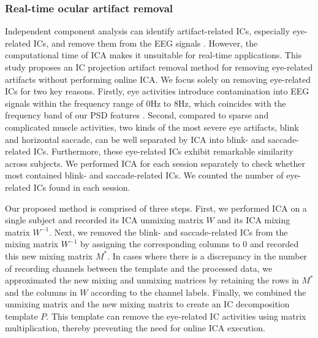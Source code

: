 \documentclass[journal]{IEEEtran}
\newcommand{\mc}[1]{\textcolor{red}{#1}}
\begin{document}
\subsubsection{Real-time ocular artifact removal}
Independent component analysis can identify artifact-related ICs, especially eye-related ICs, and remove them from the EEG signals \cite{Jung2000_bbs, bigdely2013eyecatch, Frolich2004}.
However, the computational time of ICA makes it unsuitable for real-time applications.
This study proposes an IC projection artifact removal method for removing eye-related artifacts without performing online ICA.
We focus solely on removing eye-related ICs for two key reasons. Firstly, eye activities introduce contamination into EEG signals within the frequency range of 0Hz to 8Hz, which coincides with the frequency band of our PSD features \cite{schlogl2007eog_freq_range}.
Second, compared to  sparse and complicated muscle activities, two kinds of the most severe eye artifacts, blink and horizontal saccade, can be well separated by ICA into blink- and saccade-related ICs.  Furthermore, these eye-related ICs exhibit remarkable similarity across subjects.
We performed ICA for each session separately to check whether most contained blink- and saccade-related ICs. We counted the number of eye-related ICs found in each session.
\par
Our proposed method is comprised of three steps.
First, we performed ICA on a single subject and recorded its ICA unmixing matrix $W$ and its ICA mixing matrix $W^{-1}$.
Next, we removed the blink- and saccade-related ICs from the mixing matrix $W^{-1}$ by assigning the corresponding columns to 0 and recorded this new mixing matrix $M^*$.
In cases where there is a discrepancy in the number of recording channels between the template and the processed data, we approximated the new mixing and unmixing matrices by retaining the rows in $M^*$ and the columns in $W$ according to the channel labels.
Finally, we combined the unmixing matrix and the new mixing matrix to create an IC decomposition template $P$.
This template can remove the eye-related IC activities using matrix multiplication, thereby preventing the need for online ICA execution.
\end{document}
